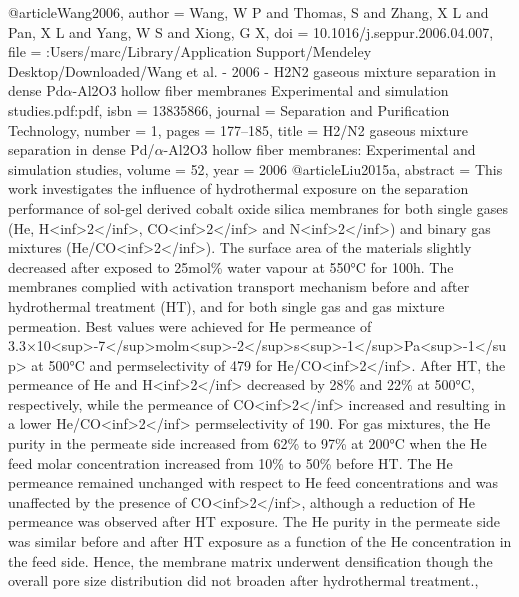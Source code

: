 @article{Wang2006,
author = {Wang, W P and Thomas, S and Zhang, X L and Pan, X L and Yang, W S and Xiong, G X},
doi = {10.1016/j.seppur.2006.04.007},
file = {:Users/marc/Library/Application Support/Mendeley Desktop/Downloaded/Wang et al. - 2006 - H2N2 gaseous mixture separation in dense Pd$\alpha$-Al2O3 hollow fiber membranes Experimental and simulation studies.pdf:pdf},
isbn = {13835866},
journal = {Separation and Purification Technology},
number = {1},
pages = {177--185},
title = {{H2/N2 gaseous mixture separation in dense Pd/$\alpha$-Al2O3 hollow fiber membranes: Experimental and simulation studies}},
volume = {52},
year = {2006}
}
@article{Liu2015a,
abstract = {This work investigates the influence of hydrothermal exposure on the separation performance of sol-gel derived cobalt oxide silica membranes for both single gases (He, H{\textless}inf{\textgreater}2{\textless}/inf{\textgreater}, CO{\textless}inf{\textgreater}2{\textless}/inf{\textgreater} and N{\textless}inf{\textgreater}2{\textless}/inf{\textgreater}) and binary gas mixtures (He/CO{\textless}inf{\textgreater}2{\textless}/inf{\textgreater}). The surface area of the materials slightly decreased after exposed to 25mol{\%} water vapour at 550°C for 100h. The membranes complied with activation transport mechanism before and after hydrothermal treatment (HT), and for both single gas and gas mixture permeation. Best values were achieved for He permeance of 3.3×10{\textless}sup{\textgreater}-7{\textless}/sup{\textgreater}molm{\textless}sup{\textgreater}-2{\textless}/sup{\textgreater}s{\textless}sup{\textgreater}-1{\textless}/sup{\textgreater}Pa{\textless}sup{\textgreater}-1{\textless}/sup{\textgreater} at 500°C and permselectivity of 479 for He/CO{\textless}inf{\textgreater}2{\textless}/inf{\textgreater}. After HT, the permeance of He and H{\textless}inf{\textgreater}2{\textless}/inf{\textgreater} decreased by 28{\%} and 22{\%} at 500°C, respectively, while the permeance of CO{\textless}inf{\textgreater}2{\textless}/inf{\textgreater} increased and resulting in a lower He/CO{\textless}inf{\textgreater}2{\textless}/inf{\textgreater} permselectivity of 190. For gas mixtures, the He purity in the permeate side increased from 62{\%} to 97{\%} at 200°C when the He feed molar concentration increased from 10{\%} to 50{\%} before HT. The He permeance remained unchanged with respect to He feed concentrations and was unaffected by the presence of CO{\textless}inf{\textgreater}2{\textless}/inf{\textgreater}, although a reduction of He permeance was observed after HT exposure. The He purity in the permeate side was similar before and after HT exposure as a function of the He concentration in the feed side. Hence, the membrane matrix underwent densification though the overall pore size distribution did not broaden after hydrothermal treatment.},
}
